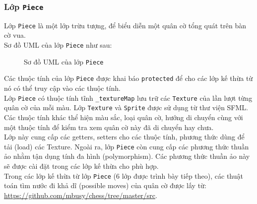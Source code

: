 \subsubsection{Lớp \lstinline{Piece}}
Lớp \lstinline{Piece} là một lớp trừu tượng, để biểu diễn một quân cờ tổng quát trên bàn cờ vua.\\
Sơ đồ UML của lớp \lstinline{Piece} như sau:
\begin{figure}[H]
\caption{Sơ đồ UML của lớp \lstinline{Piece}}
\end{figure}
Các thuộc tính của lớp \lstinline{Piece} được khai báo \lstinline{protected} để cho các lớp kế thừa từ nó có thể truy cập vào các thuộc tính.\\
Lớp \lstinline{Piece} có thuộc tính tĩnh \lstinline{_textureMap} lưu trữ các \lstinline{Texture} của lần lượt từng quân cờ của mỗi màu. Lớp \lstinline{Texture} và \lstinline{Sprite} được sử dụng từ thư viện SFML.\\
Các thuộc tính khác thể hiện màu sắc, loại quân cờ, hướng di chuyển cùng với một thuộc tính để kiểm tra xem quân cờ này đã di chuyển hay chưa.\\
Lớp này cung cấp các getters, setters cho các thuộc tính, phương thức dùng để tải (load) các Texture. Ngoài ra, lớp \lstinline{Piece} còn cung cấp các phương thức thuần ảo nhằm tận dụng tính đa hình (polymorphism). Các phương thức thuần ảo này sẽ được cài đặt trong các lớp kế thừa cho phù hợp.\\
Trong các lớp kế thừa từ lớp \lstinline{Piece} (6 lớp được trình bày tiếp theo), các thuật toán tìm nước đi khả dĩ (possible moves) của quân cờ được lấy từ: \url{https://github.com/mbusy/chess/tree/master/src}.

